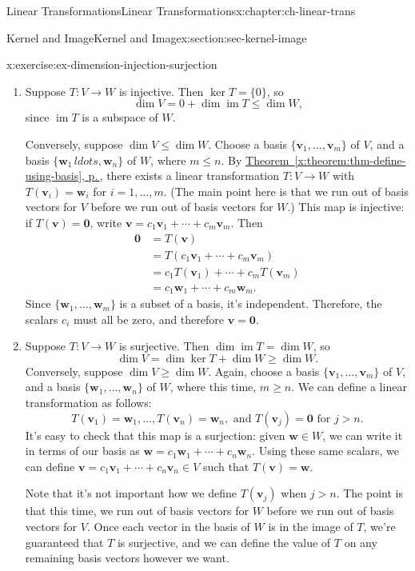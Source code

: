 \documentclass[oneside,10pt,]{book}
\newcommand{\xreffont}{\relax}
\numberwithin{equation}{section}
\newcommand{\im}{\operatorname{im}}
\newcommand{\vv}{\mathbf{v}}
\newcommand{\ww}{\mathbf{w}}
\newcommand{\amp}{&}
\begin{document}
\begin{chapterptx}{Linear Transformations}{}{Linear Transformations}{}{}{x:chapter:ch-linear-trans}
\begin{sectionptx}{Kernel and Image}{}{Kernel and Image}{}{}{x:section:sec-kernel-image}
\begin{inlineexercise}{}{x:exercise:ex-dimension-injection-surjection}
\begin{enumerate}
\item{}Suppose \(T:V\to W\) is injective. Then \(\ker T = \{0\}\), so%
\begin{equation*}
\dim V = 0 + \dim \im T \leq \dim W\text{,}
\end{equation*}
since \(\im T\) is a subspace of \(W\).%
\par
Conversely, suppose \(\dim V\leq \dim W\). Choose a basis \(\{\vv_1,\ldots, \vv_m\}\) of \(V\), and a basis \(\{\ww_1\,ldots, \ww_n\}\) of \(W\), where \(m\leq n\). By \hyperref[x:theorem:thm-define-using-basis]{Theorem~{\xreffont\ref{x:theorem:thm-define-using-basis}}, p.\,\pageref{x:theorem:thm-define-using-basis}}, there exists a linear transformation \(T:V\to W\) with \(T(\vv_i)=\ww_i\) for \(i=1,\ldots, m\). (The main point here is that we run out of basis vectors for \(V\) before we run out of basis vectors for \(W\).) This map is injective: if \(T(\vv)=\mathbf{0}\), write \(\vv=c_1\vv_1+\cdots + c_m\vv_m\). Then%
\begin{align*}
\mathbf{0} \amp = T(\vv)\\
\amp = T(c_1\vv_1+\cdots + c_m\vv_m)\\
\amp = c_1T(\vv_1)+\cdots + c_mT(\vv_m)\\
\amp = c_1\ww_1+\cdots +c_m\ww_m\text{.}
\end{align*}
Since \(\{\ww_1,\ldots, \ww_m\}\) is a subset of a basis, it's independent. Therefore, the scalars \(c_i\) must all be zero, and therefore \(\vv=\mathbf{0}\).%
\item{}Suppose \(T:V\to W\) is surjective. Then \(\dim \im T = \dim W\), so%
\begin{equation*}
\dim V = \dim \ker T + \dim W \geq  \dim W\text{.}
\end{equation*}
Conversely, suppose \(\dim V\geq \dim W\). Again, choose a basis \(\{\vv_1,\ldots, \vv_m\}\) of \(V\), and a basis \(\{\ww_1,\ldots, \ww_n\}\) of \(W\), where this time, \(m\geq n\). We can define a linear transformation as follows:%
\begin{equation*}
T(\vv_1)=\ww_1,\ldots, T(\vv_n)=\ww_n, \text{ and } T(\vv_j) = \mathbf{0} \text{ for } j>n.
\end{equation*}
It's easy to check that this map is a surjection: given \(\ww\in W\), we can write it in terms of our basis as \(\ww=c_1\ww_1+\cdots + c_n\ww_n\). Using these same scalars, we can define \(\vv=c_1\vv_1+\cdots + c_n\vv_n\in V\) such that \(T(\vv)=\ww\).%
\par
Note that it's not important how we define \(T(\vv_j)\) when \(j>n\). The point is that this time, we run out of basis vectors for \(W\) before we run out of basis vectors for \(V\). Once each vector in the basis of \(W\) is in the image of \(T\), we're guaranteed that \(T\) is surjective, and we can define the value of \(T\) on any remaining basis vectors however we want.%

\end{enumerate}
\end{inlineexercise}
\end{sectionptx}
\end{chapterptx}
\end{document}
